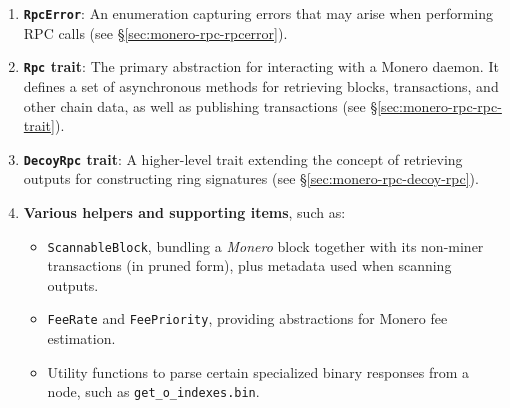 \begin{enumerate}
    \item \textbf{\texttt{RpcError}}: An enumeration capturing errors that may
    arise when performing RPC calls (see
    \S\ref{sec:monero-rpc-rpcerror}). %

    \item \textbf{\texttt{Rpc} trait}: The primary abstraction for interacting
    with a Monero daemon.  It defines a set of asynchronous methods for
    retrieving blocks, transactions, and other chain data, as well as
    publishing transactions (see \S\ref{sec:monero-rpc-rpc-trait}). %

    \item \textbf{\texttt{DecoyRpc} trait}: A higher-level trait extending the
    concept of retrieving outputs for constructing ring signatures (see
    \S\ref{sec:monero-rpc-decoy-rpc}). %

    \item \textbf{Various helpers and supporting items}, such as:
    \begin{itemize}
      \item \texttt{ScannableBlock}, bundling a \emph{Monero} block together
      with its non-miner transactions (in pruned form), plus metadata used when
      scanning outputs. %
      \item \texttt{FeeRate} and \texttt{FeePriority}, providing abstractions
      for Monero fee estimation. %
      \item Utility functions to parse certain specialized binary responses from
      a node, such as \texttt{get\_o\_indexes.bin}. %
    \end{itemize}
\end{enumerate}

